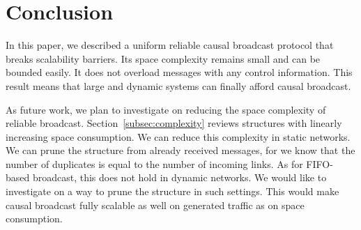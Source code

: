 
\section{Conclusion}
\label{sec:conclusion}



In this paper, we described a uniform reliable causal broadcast protocol that
breaks scalability barriers. Its space complexity remains small and can be
bounded easily. It does not overload messages with any control information. This
result means that large and dynamic systems can finally afford causal broadcast.




As future work, we plan to investigate on reducing the space complexity of
reliable broadcast. Section~\ref{subsec:complexity} reviews structures with
linearly increasing space consumption. We can reduce this complexity in static
networks. We can prune the structure from already received messages, for we know
that the number of duplicates is equal to the number of incoming links. As for
FIFO-based broadcast, this does not hold in dynamic networks. We would like to
investigate on a way to prune the structure in such settings. This would make
causal broadcast fully scalable as well on generated traffic as on space
consumption.







